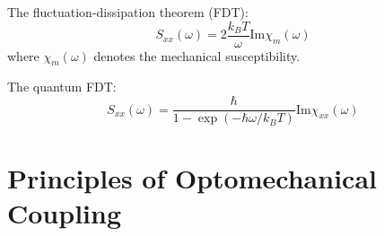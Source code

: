 \documentclass[8pt,a4paper,twocolumn]{article} %
\numberwithin{equation}{section} %
\begin{document}
				The fluctuation-dissipation theorem (FDT):
				\begin{equation}
					S_{xx}(\omega)=2 \frac{k_B T}{\omega} \text{Im} \chi_m (\omega)
				\end{equation}
				where $\chi_m (\omega)$ denotes the mechanical susceptibility.

				The quantum FDT:
				\begin{equation}
					S_{xx}(\omega)= \frac{\hbar}{1-\exp (-\hbar \omega/k_B T) } \text{Im} \chi_{xx} (\omega)
				\end{equation}




	\section{Principles of Optomechanical Coupling} %
	\label{sec:principles_of_optomechanical_coupling}
	

\end{document}
